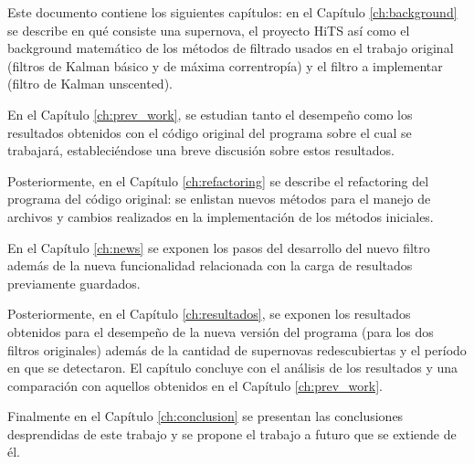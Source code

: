 Este documento contiene los siguientes cap\'itulos: en el Cap\'itulo \ref{ch:background} se describe en qu\'e consiste una supernova, el proyecto HiTS  as\'i como el background matem\'atico de los m\'etodos de filtrado usados en el trabajo original (filtros de Kalman b\'asico y de m\'axima correntrop\'ia) y el filtro a implementar (filtro de Kalman unscented).%
\bigskip


En el Cap\'itulo \ref{ch:prev_work}, se estudian tanto el desempe\~no como los resultados obtenidos con el c\'odigo original del programa sobre el cual se trabajar\'a, estableci\'endose una breve discusi\'on sobre estos resultados. 
\bigskip

Posteriormente, en el Cap\'itulo \ref{ch:refactoring} se describe el refactoring del programa  del c\'odigo original: se enlistan nuevos m\'etodos para el manejo de archivos y cambios realizados en la implementaci\'on de los m\'etodos iniciales. 
\bigskip

En el Cap\'itulo \ref{ch:news} se exponen los pasos del desarrollo del nuevo filtro adem\'as de la nueva funcionalidad relacionada con la carga de resultados previamente guardados.
\bigskip

Posteriormente, en el Cap\'itulo \ref{ch:resultados}, se exponen los resultados obtenidos para el desempe\~no de la nueva versi\'on del programa (para los dos filtros originales) adem\'as de la cantidad de supernovas redescubiertas y el per\'iodo en que se detectaron. El cap\'itulo concluye con el an\'alisis de los resultados y una comparaci\'on con aquellos obtenidos en el Cap\'itulo \ref{ch:prev_work}.
\bigskip

Finalmente en el Cap\'itulo \ref{ch:conclusion} se presentan las conclusiones desprendidas de este trabajo y se propone el trabajo a futuro que se extiende de \'el.


